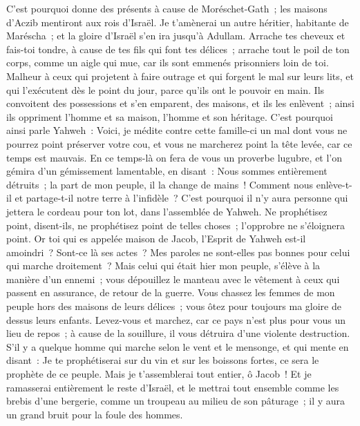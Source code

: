 \begin{multicols}{2}
C'est pourquoi donne des présents à cause de Moréschet-Gath~; les maisons d'Aczib mentiront aux rois d'Israël.
Je t'amènerai un autre héritier, habitante de Maréscha~; et la gloire d'Israël s'en ira jusqu'à Adullam.
Arrache tes cheveux et fais-toi tondre, à cause de tes fils qui font tes délices~; arrache tout le poil de ton corps, comme un aigle qui mue, car ils sont emmenés prisonniers loin de toi.
\VerseOne{}Malheur à ceux qui projetent à faire outrage et qui forgent le mal sur leurs lits, et qui l'exécutent dès le point du jour, parce qu'ils ont le pouvoir en main.
Ils convoitent des possessions et s'en emparent, des maisons, et ils les enlèvent~; ainsi ils oppriment l'homme et sa maison, l'homme et son héritage.
C'est pourquoi ainsi parle Yahweh~: Voici, je médite contre cette famille-ci un mal dont vous ne pourrez point préserver votre cou, et vous ne marcherez point la tête levée, car ce temps est mauvais.
En ce temps-là on fera de vous un proverbe lugubre, et l'on gémira d'un gémissement lamentable, en disant~: Nous sommes entièrement détruits~; la part de mon peuple, il la change de mains~! Comment nous enlève-t-il et partage-t-il notre terre à l'infidèle~?
C'est pourquoi il n'y aura personne qui jettera le cordeau pour ton lot, dans l'assemblée de Yahweh.
Ne prophétisez point, disent-ils, ne prophétisez point de telles choses~; l'opprobre ne s'éloignera point.
Or toi qui es appelée maison de Jacob, l'Esprit de Yahweh est-il amoindri~? Sont-ce là ses actes~? Mes paroles ne sont-elles pas bonnes pour celui qui marche droitement~?
Mais celui qui était hier mon peuple, s'élève à la manière d'un ennemi~; vous dépouillez le manteau avec le vêtement à ceux qui passent en assurance, de retour de la guerre.
Vous chassez les femmes de mon peuple hors des maisons de leurs délices~; vous ôtez pour toujours ma gloire de dessus leurs enfants.
Levez-vous et marchez, car ce pays n'est plus pour vous un lieu de repos~; à cause de la souillure, il vous détruira d'une violente destruction.
S'il y a quelque homme qui marche selon le vent et le mensonge, et qui mente en disant~: Je te prophétiserai sur du vin et sur les boissons fortes, ce sera le prophète de ce peuple.
Mais je t'assemblerai tout entier, ô Jacob~! Et je ramasserai entièrement le reste d'Israël, et le mettrai tout ensemble comme les brebis d'une bergerie, comme un troupeau au milieu de son pâturage~; il y aura un grand bruit pour la foule des hommes.

\end{multicols}
